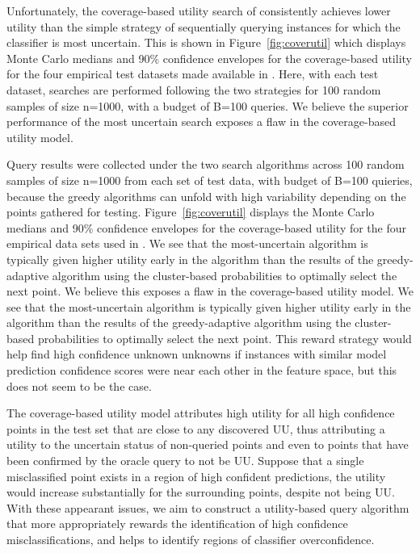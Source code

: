 \documentclass[letterpaper]{article} %
\newcommand{\wdb}[1]{{\color{blue} #1}} %
\begin{document}
\wdb{Unfortunately, the coverage-based utility search of \citet{Bansal2018} consistently achieves lower utility than the simple strategy of sequentially querying instances for which the classifier is most uncertain.  This is shown in Figure~\ref{fig:coverutil} which displays Monte Carlo medians and 90\% confidence envelopes for the coverage-based utility for the four empirical test datasets made available in \citet{Bansal2018}.  Here, with each test dataset, searches are performed following the two strategies for 100 random samples of size n=1000, with a budget of B=100 queries.  We believe the superior performance of the most uncertain search exposes a flaw in the coverage-based utility model.





Query results were collected under the two search algorithms across 100 random samples of size n=1000 from each set of test data, with budget of B=100 quieries, because the greedy algorithms can unfold with high variability depending on the points gathered for testing. Figure~\ref{fig:coverutil} displays the Monte Carlo medians and 90\% confidence envelopes for the coverage-based utility for the four empirical data sets used in \citet{Bansal2018}. We see that the most-uncertain algorithm is typically given higher utility early in the algorithm than the results of the greedy-adaptive algorithm using the cluster-based probabilities to optimally select the next point.  We believe this exposes a flaw in the coverage-based utility model.  We see that the most-uncertain algorithm is typically given higher utility early in the algorithm than the results of the greedy-adaptive algorithm using the cluster-based probabilities to optimally select the next point. This reward strategy would help find high confidence unknown unknowns if instances with similar model prediction confidence scores were near each other in the feature space, but this does not seem to be the case.}



The coverage-based utility model attributes high utility for all high confidence points in the test set that are close to any discovered UU, thus attributing a utility to the uncertain status of non-queried points and even to points that have been confirmed by the oracle query to not be UU. Suppose that a single misclassified point exists in a region of high confident predictions, the utility would increase substantially for the surrounding points, despite not being UU. With these appearant issues, we aim to construct a utility-based query algorithm that more appropriately rewards the identification of high confidence misclassifications, and helps to identify regions of classifier overconfidence. 
\end{document}
